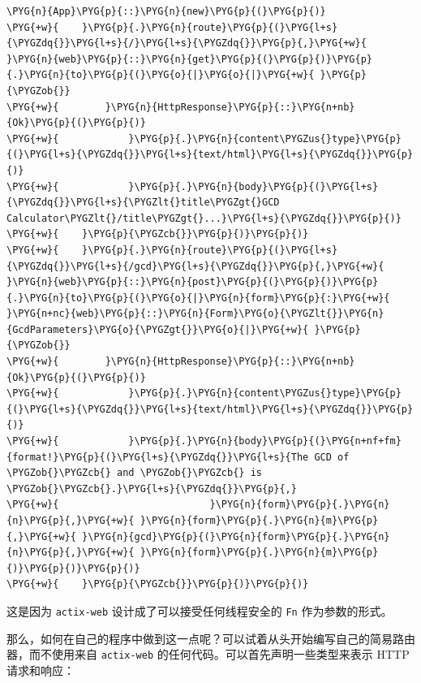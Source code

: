 \begin{Verbatim}[commandchars=\\\{\},breaklines=true,breakanywhere=true,fontsize=\codefont,xleftmargin=17bp]
\PYG{n}{App}\PYG{p}{::}\PYG{n}{new}\PYG{p}{(}\PYG{p}{)}
\PYG{+w}{    }\PYG{p}{.}\PYG{n}{route}\PYG{p}{(}\PYG{l+s}{\PYGZdq{}}\PYG{l+s}{/}\PYG{l+s}{\PYGZdq{}}\PYG{p}{,}\PYG{+w}{ }\PYG{n}{web}\PYG{p}{::}\PYG{n}{get}\PYG{p}{(}\PYG{p}{)}\PYG{p}{.}\PYG{n}{to}\PYG{p}{(}\PYG{o}{|}\PYG{o}{|}\PYG{+w}{ }\PYG{p}{\PYGZob{}}
\PYG{+w}{        }\PYG{n}{HttpResponse}\PYG{p}{::}\PYG{n+nb}{Ok}\PYG{p}{(}\PYG{p}{)}
\PYG{+w}{            }\PYG{p}{.}\PYG{n}{content\PYGZus{}type}\PYG{p}{(}\PYG{l+s}{\PYGZdq{}}\PYG{l+s}{text/html}\PYG{l+s}{\PYGZdq{}}\PYG{p}{)}
\PYG{+w}{            }\PYG{p}{.}\PYG{n}{body}\PYG{p}{(}\PYG{l+s}{\PYGZdq{}}\PYG{l+s}{\PYGZlt{}title\PYGZgt{}GCD Calculator\PYGZlt{}/title\PYGZgt{}...}\PYG{l+s}{\PYGZdq{}}\PYG{p}{)}
\PYG{+w}{    }\PYG{p}{\PYGZcb{}}\PYG{p}{)}\PYG{p}{)}
\PYG{+w}{    }\PYG{p}{.}\PYG{n}{route}\PYG{p}{(}\PYG{l+s}{\PYGZdq{}}\PYG{l+s}{/gcd}\PYG{l+s}{\PYGZdq{}}\PYG{p}{,}\PYG{+w}{ }\PYG{n}{web}\PYG{p}{::}\PYG{n}{post}\PYG{p}{(}\PYG{p}{)}\PYG{p}{.}\PYG{n}{to}\PYG{p}{(}\PYG{o}{|}\PYG{n}{form}\PYG{p}{:}\PYG{+w}{ }\PYG{n+nc}{web}\PYG{p}{::}\PYG{n}{Form}\PYG{o}{\PYGZlt{}}\PYG{n}{GcdParameters}\PYG{o}{\PYGZgt{}}\PYG{o}{|}\PYG{+w}{ }\PYG{p}{\PYGZob{}}
\PYG{+w}{        }\PYG{n}{HttpResponse}\PYG{p}{::}\PYG{n+nb}{Ok}\PYG{p}{(}\PYG{p}{)}
\PYG{+w}{            }\PYG{p}{.}\PYG{n}{content\PYGZus{}type}\PYG{p}{(}\PYG{l+s}{\PYGZdq{}}\PYG{l+s}{text/html}\PYG{l+s}{\PYGZdq{}}\PYG{p}{)}
\PYG{+w}{            }\PYG{p}{.}\PYG{n}{body}\PYG{p}{(}\PYG{n+nf+fm}{format!}\PYG{p}{(}\PYG{l+s}{\PYGZdq{}}\PYG{l+s}{The GCD of \PYGZob{}\PYGZcb{} and \PYGZob{}\PYGZcb{} is \PYGZob{}\PYGZcb{}.}\PYG{l+s}{\PYGZdq{}}\PYG{p}{,}
\PYG{+w}{                          }\PYG{n}{form}\PYG{p}{.}\PYG{n}{n}\PYG{p}{,}\PYG{+w}{ }\PYG{n}{form}\PYG{p}{.}\PYG{n}{m}\PYG{p}{,}\PYG{+w}{ }\PYG{n}{gcd}\PYG{p}{(}\PYG{n}{form}\PYG{p}{.}\PYG{n}{n}\PYG{p}{,}\PYG{+w}{ }\PYG{n}{form}\PYG{p}{.}\PYG{n}{m}\PYG{p}{)}\PYG{p}{)}\PYG{p}{)}
\PYG{+w}{    }\PYG{p}{\PYGZcb{}}\PYG{p}{)}\PYG{p}{)}
\end{Verbatim}

这是因为 \texttt{actix-web} 设计成了可以接受任何线程安全的 \texttt{Fn} 作为参数的形式。

那么，如何在自己的程序中做到这一点呢？可以试着从头开始编写自己的简易路由器，而不使用来自 \texttt{actix-web} 的任何代码。可以首先声明一些类型来表示 HTTP 请求和响应：

